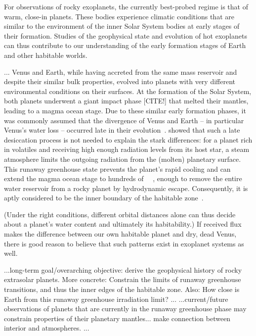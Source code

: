 \documentclass[twocolumn]{aastex631}
\begin{document}
\begin{note}
For observations of rocky exoplanets, the currently best-probed regime is that of warm, close-in planets.
These bodies experience climatic conditions that are similar to the environment of the inner Solar System bodies at early stages of their formation.
Studies of the geophysical state and evolution of hot exoplanets can thus contribute to our understanding of the early formation stages of Earth and other habitable worlds.

...
    Venus and Earth, while having accreted from the same mass reservoir and despite their similar bulk properties, evolved into planets with very different environmental conditions on their surfaces.
    At the formation of the Solar System, both planets underwent a giant impact phase [CITE!] that melted their mantles, leading to a magma ocean stage.
    Due to these similar early formation phases, it was commonly assumed that the divergence of Venus and Earth -- in particular Venus's water loss -- occurred late in their evolution~\citep{Elkins-Tanton2013}.
    \citet{Hamano2013} showed that such a late desiccation process is not needed to explain the stark differences: for a planet rich in volatiles and receiving high enough radiation levels from its host star, a steam atmosphere limits the outgoing radiation from the (molten) planetary surface.
    This runaway greenhouse state prevents the planet's rapid cooling and can extend the magma ocean stage to hundreds of \SI{}{\mega\year}, enough to remove the entire water reservoir from a rocky planet by hydrodynamic escape.
    Consequently, it is aptly considered to be the inner boundary of the habitable zone~\citep{Kasting1993,Kopparapu2013}.

    (Under the right conditions, different orbital distances alone can thus decide about a planet's water content and ultimately its habitability.)
    If received flux makes the difference between our own habitable planet and dry, dead Venus, there is good reason to believe that such patterns exist in exoplanet systems as well.

    ...long-term goal/overarching objective: derive the geophysical history of rocky extrasolar planets. More concrete: Constrain the limits of runaway greenhouse transitions, and thus the inner edges of the habitable zone. Also: How close is Earth from this runaway greenhouse irradiation limit?
   ...
    ...current/future observations of planets that are currently in the runaway greenhouse phase may constrain properties of their planetary mantles... make connection between interior and atmospheres.
    ...


\end{note}
\end{document}
